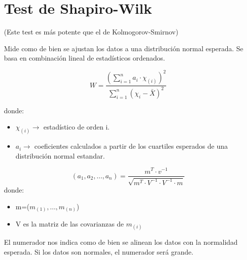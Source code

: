 \section{Test de Shapiro-Wilk}
(Este test es más potente que el de Kolmogorov-Smirnov)

Mide como de bien se ajustan los datos a una distribución normal esperada. 
Se basa en combinación lineal de estadísticos ordenados. %

\[
W=\frac{\left(\sum_{i=1}^{n} a_i \cdot \chi_{(i)}\right)^2}{\sum_{i=1}^{n}(\chi_i-\bar{X})^2}
\]

donde:
\begin{itemize}
    \item $\chi_{(i)} \longrightarrow$ estadístico de orden i.
    \item $a_i \longrightarrow$ coeficientes calculados a partir de los cuartiles esperados de una distribución normal estandar. 
\end{itemize}

\[
(a_1,a_2,\dots,a_n)=\frac{m^T\cdot v^{-1}}{\sqrt{m^T \cdot V^{-1} \cdot V^{-1} \cdot m}}
\]
\newpage
donde:
\begin{itemize}
    \item m=($m_{(1)},\dots,m_{(n)}$)
    \item V es la matriz de las covarianzas de $m_{(i)}$
\end{itemize}

El numerador nos indica como de bien se alinean los datos con la normalidad esperada. Si los datos son normales, el numerador será grande.








